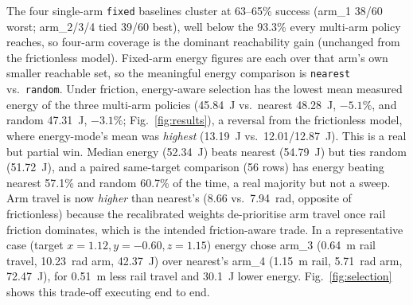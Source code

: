 \documentclass[conference]{IEEEtran}
\begin{document}
\begin{table}[htbp]
\caption{Selection-policy comparison under the rail-friction model.}
\begin{center}
\label{tab:e3}
\end{center}
\end{table}

The four single-arm \texttt{fixed} baselines cluster at 63--65\%
success (arm\_1 38/60 worst; arm\_2/3/4 tied 39/60 best), well below the 93.3\%
every multi-arm policy reaches, so four-arm coverage is the dominant reachability
gain (unchanged from the frictionless model). Fixed-arm energy figures are each
over that arm's own smaller reachable set, so the meaningful energy comparison is
\texttt{nearest} vs.\ \texttt{random}. Under friction, energy-aware
selection has the lowest mean measured energy of the three multi-arm policies
(45.84~J vs.\ nearest 48.28~J, $-5.1\%$, and random 47.31~J, $-3.1\%$;
Fig.~\ref{fig:results}), a
reversal from the frictionless model, where energy-mode's mean was
\emph{highest} (13.19~J vs.\ 12.01/12.87~J). This is a real but partial win. Median
energy (52.34~J) beats nearest (54.79~J) but ties random (51.72~J), and a paired
same-target comparison (56 rows) has energy beating nearest 57.1\% and random
60.7\% of the time, a real majority but not a sweep. Arm travel is now
\emph{higher} than nearest's (8.66 vs.\ 7.94~rad, opposite of frictionless)
because the recalibrated weights de-prioritise arm travel once rail friction
dominates, which is the intended friction-aware trade. In a representative case (target
$x{=}1.12,y{=}-0.60,z{=}1.15$) energy chose arm\_3 (0.64~m rail travel, 10.23~rad
arm, 42.37~J) over nearest's arm\_4 (1.15~m rail, 5.71~rad arm, 72.47~J), for
0.51~m less rail travel and 30.1~J lower energy. Fig.~\ref{fig:selection} shows
this trade-off executing end to end.
\end{document}
